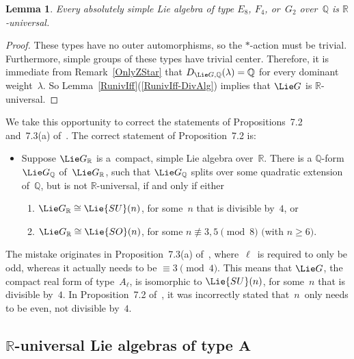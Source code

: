 \documentclass[pdftex]{sigma}
\numberwithin{equation}{section}
\newtheorem{lem}[prop]{Lemma}
{\theoremstyle{definition}
\newtheorem{defn}[prop]{Definition}
\newtheorem{notation}[prop]{Notation}
\newtheorem{rem}[prop]{Remark}
\newtheorem{ques}[prop]{Question}
\newtheorem{eg}[prop]{Example}
\newtheorem{erratum}[prop]{Erratum}}
\begin{document}
\begin{lem}
\label{EFGAllUniv}
Every absolutely simple Lie algebra of type $E_8$, $F_4$, or~$G_2$ over~$\mathbb{Q}$ is $\mathbb{R}$-universal.
\end{lem}

\begin{proof}
These types have no outer automorphisms, so the $*$-action must be trivial.
Furthermore, simple groups of these types have trivial center.
Therefore, it is immediate from Remark~\ref{OnlyZStar} that $D_{\Lie G, \mathbb{Q}}(\lambda) = \mathbb{Q}$ for every dominant
weight~$\lambda$.
So Lemma~\ref{RunivIff}(\ref{RunivIff-DivAlg}) implies that $\Lie G$ is $\mathbb{R}$-universal.
\end{proof}

\begin{erratum}
We take this opportunity to correct the statements of Propositions~7.2 and~7.3(a) of~\cite{Morris-RRepsQForms}.
The correct statement of Proposition~7.2 is:
\begin{itemize}\itemsep=0pt
\it
\item[] Suppose $\Lie G_\mathbb{R}$ is a~compact, simple Lie algebra over~$\mathbb{R}$.
There is a $\mathbb{Q}$-form $\Lie G_\mathbb{Q}$ of~$\Lie G_\mathbb{R}$, such that $\Lie G_\mathbb{Q}$ splits
over some quadratic extension of~$\mathbb{Q}$, but is not $\mathbb{R}$-universal, if and only if either
\begin{enumerate}[{\rm (}a{\rm )}]\itemsep=0pt
\item
$\Lie G_\mathbb{R} \cong \Lie{SU}(n)$, for some~$n$ that is divisible by~$4$, or
\item
$\Lie G_\mathbb{R} \cong \Lie{SO}(n)$, for some $n \not\equiv 3,5 \pmod{8}$ $($with $n \ge 6)$.
\end{enumerate}
\end{itemize}
The mistake originates in Proposition~7.3(a) of~\cite{Morris-RRepsQForms}, where~$\ell$~is required to only be odd,
whereas it actually needs to be $\equiv 3 \pmod{4}$.
This means that $\Lie G$, the compact real form of type~$A_\ell$, is isomorphic to $\Lie{SU}(n)$, for some~$n$ that is
divisible by~$4$.
In Proposition~7.2 of~\cite{Morris-RRepsQForms}, it was incorrectly stated that~$n$~only needs to be even, not divisible
by~$4$.
\end{erratum}

\subsection[$\mathbb{R}$-universal Lie algebras of type $A$]{$\boldsymbol{\mathbb{R}}$-universal Lie algebras of type $\boldsymbol{A}$}\label{TypeA}
\end{document}
